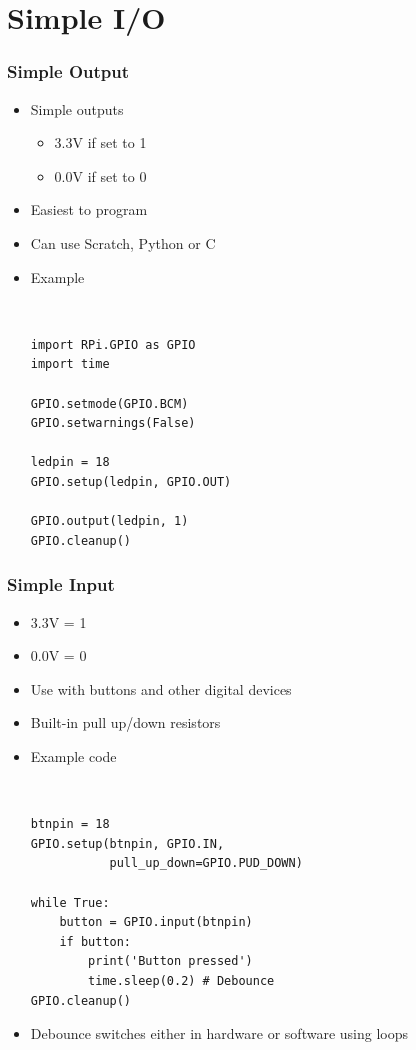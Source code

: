 \documentclass[slidestop,usepdftitle=false,14pt,table]{beamer}
\begin{document}
\section{Simple I/O}
\begin{frame}
  \frametitle{Simple Output}
  \begin{itemize}
  \item Simple outputs
    \begin{itemize}
    \item 3.3V if set to 1
    \item 0.0V if set to 0
    \end{itemize}
  \item Easiest to program
  \item Can use Scratch, Python or C
  \item Example\\
    {\tt\small
\begin{verbatim}
import RPi.GPIO as GPIO
import time

GPIO.setmode(GPIO.BCM)
GPIO.setwarnings(False)

ledpin = 18
GPIO.setup(ledpin, GPIO.OUT)

GPIO.output(ledpin, 1)
GPIO.cleanup()
\end{verbatim}
    }

  \end{itemize}
\end{frame}

\begin{frame}
\frametitle{Simple Input}
\begin{itemize}
\item 3.3V = 1
\item 0.0V = 0
\item Use with buttons and other digital devices
\item Built-in pull up/down resistors
\item Example code\\
    {\tt\small
\begin{verbatim}
btnpin = 18
GPIO.setup(btnpin, GPIO.IN, 
           pull_up_down=GPIO.PUD_DOWN)

while True:
    button = GPIO.input(btnpin)
    if button:
        print('Button pressed')
        time.sleep(0.2) # Debounce
GPIO.cleanup()
\end{verbatim}
    }
\item Debounce switches either in hardware or software using loops
\end{itemize}
\end{frame}
\end{document}
